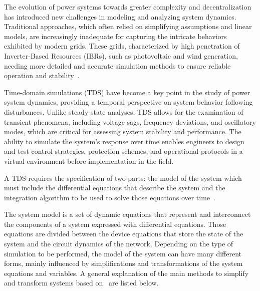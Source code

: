 
The evolution of power systems towards greater complexity and decentralization has introduced new challenges in modeling and analyzing system dynamics. 
Traditional approaches, which often relied on simplifying assumptions and linear models, are increasingly inadequate for capturing the intricate behaviors 
exhibited by modern grids. These grids, characterized by high penetration of Inverter-Based Resources (IBRs), such as photovoltaic and wind generation,
needing more detailed and accurate simulation methods to ensure reliable operation and stability~\cite{LaraTDS}.

Time-domain simulations (TDS) have become a key point in the study of power system dynamics, providing a temporal perspective on system behavior following disturbances.
Unlike steady-state analyses, TDS allows for the examination of transient phenomena, including voltage sags, frequency deviations, and oscillatory modes, 
which are critical for assessing system stability and performance. The ability to simulate the system's response over time enables engineers to design and test control strategies,
protection schemes, and operational protocols in a virtual environment before implementation in the field.

A TDS requires the specification of two parts: the model of the system which must include the differential equations that describe the system and the
integration algorithm to be used to solve those equations over time~\cite{LaraTDS}. 

The system model is a set of dynamic equations that represent and interconnect the components of a system expressed with differential equations. Those
equations are divided between the device equations that store the state of the system and the circuit dynamics of the network. Depending on the type of
simulation to be performed, the model of the system can have many different forms, mainly influenced by simplifications and transformations of the system equations and 
variables. A general explanation of the main methods to simplify and transform systems based on~\cite{LaraTDS} are listed below.

